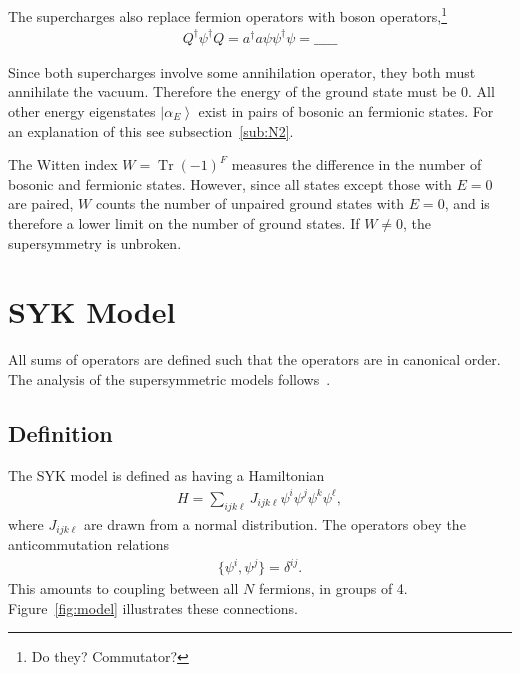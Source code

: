 \documentclass[12pt]{article} %
\renewcommand{\l}{\ell}
\newcommand{\ket}[1]{\left|#1\right\rangle}
\DeclareMathOperator{\Tr}{Tr}
\begin{document}
The supercharges also replace fermion operators with boson operators,\footnote{Do they? Commutator?}
\begin{align}
Q^\dag\psi^\dag Q = a^\dag a \psi\psi^\dag \psi =\_\_\_\_\_
\end{align}

Since both supercharges involve some annihilation operator, they both must annihilate the vacuum. Therefore the energy of the ground state must be 0. All other energy eigenstates $\ket{\alpha_E}$ exist in pairs of bosonic an fermionic states. For an explanation of this see subsection~\ref{sub:N2}.

The Witten index $W = \Tr(-1)^F$ measures the difference in the number of bosonic and fermionic states. However, since all states except those with $E=0$ are paired, $W$ counts the number of unpaired ground states with $E=0$, and is therefore a lower limit on the number of ground states. If $W\ne0$, the supersymmetry is unbroken.

\section{SYK Model} \label{sec:syk}

All sums of operators are defined such that the operators are in canonical order. The analysis of the supersymmetric models follows~\cite{fu16}.

\subsection{Definition} \emph{}

The SYK model is defined as having a Hamiltonian
\begin{align}
H = \sum_{ijk\l}J_{ijk\l}\psi^i\psi^j\psi^k\psi^\l,
\end{align}
where $J_{ijk\l}$ are drawn from a normal distribution. The operators obey the anticommutation relations
\begin{align}
\{\psi^i,\psi^j\} = \delta^{ij}.
\end{align}
This amounts to coupling between all $N$ fermions, in groups of 4. Figure~\ref{fig:model} illustrates these connections.
\end{document}
